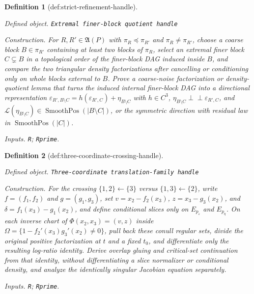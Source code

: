 \documentclass{article}
\newtheorem{definition}{Definition}
\begin{document}
\begin{definition}[def:strict-refinement-handle]\label{def:strict-refinement-handle}
\par\smallskip\noindent\emph{Defined object.} \texttt{Extremal finer-\allowbreak{}block quotient handle}
\par\smallskip\noindent\emph{Construction.} For \(R,R'\in\mathfrak A(P)\) with \(\pi_R\preceq\pi_{R'}\) and \(\pi_R\neq\pi_{R'}\), choose a coarse block \(B\in\pi_{R'}\) containing at least two blocks of \(\pi_R\), select an extremal finer block \(C\subsetneq B\) in a topological order of the finer-block DAG induced inside \(B\), and compare the two triangular density factorizations after cancelling or conditioning only on whole blocks external to \(B\). Prove a coarse-noise factorization or density-quotient lemma that turns the induced internal finer-block DAG into a directional representation \(\varepsilon_{R',B\setminus C}=h(\varepsilon_{R',C})+\eta_{B\setminus C}\) with \(h\in C^3\), \(\eta_{B\setminus C}\perp\!\!\!\perp\varepsilon_{R',C}\), and \(\mathcal L(\eta_{B\setminus C})\in\operatorname{SmoothPos}(|B\setminus C|)\), or the symmetric direction with residual law in \(\operatorname{SmoothPos}(|C|)\).
\par\smallskip\noindent\emph{Inputs.} \texttt{R}; \texttt{Rprime}.
\end{definition}

\begin{definition}[def:three-coordinate-crossing-handle]\label{def:three-coordinate-crossing-handle}
\par\smallskip\noindent\emph{Defined object.} \texttt{Three-\allowbreak{}coordinate translation-\allowbreak{}family handle}
\par\smallskip\noindent\emph{Construction.} For the crossing \(\{1,2\}\leftarrow\{3\}\) versus \(\{1,3\}\leftarrow\{2\}\), write \(f=(f_1,f_2)\) and \(g=(g_1,g_3)\), set \(v=x_2-f_2(x_3)\), \(z=x_3-g_3(x_2)\), and \(\delta=f_1(x_3)-g_1(x_2)\), and define conditional slices only on \(E_{p_\varepsilon}\) and \(E_{p_\eta}\). On each inverse chart of \(\Phi(x_2,x_3)=(v,z)\) inside \(\Omega=\{1-f_2'(x_3)g_3'(x_2)\neq0\}\), pull back these conull regular sets, divide the original positive factorization at \(t\) and a fixed \(t_0\), and differentiate only the resulting log-ratio identity. Derive overlap gluing and critical-set continuation from that identity, without differentiating a slice normalizer or conditional density, and analyze the identically singular Jacobian equation separately.
\par\smallskip\noindent\emph{Inputs.} \texttt{R}; \texttt{Rprime}.
\end{definition}
\end{document}
